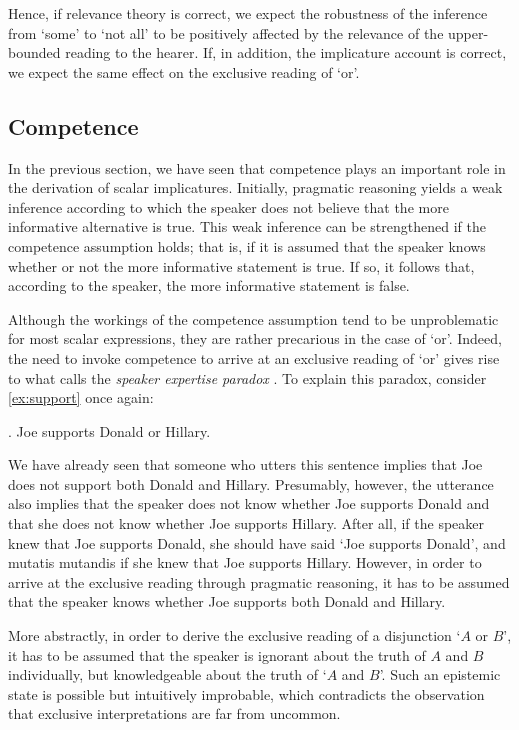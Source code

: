 \documentclass[12pt]{article}
\begin{document}
Hence, if relevance theory is correct, we expect the robustness of the inference from `some' to `not all' to be positively affected by the relevance of the upper-bounded reading to the hearer. If, in addition, the implicature account is correct, we expect the same effect on the exclusive reading of `or'.

\subsection*{Competence}

In the previous section, we have seen that competence plays an important role in the derivation of scalar implicatures. Initially, pragmatic reasoning yields a weak inference according to which the speaker does not believe that the more informative alternative is true. This weak inference can be strengthened if the competence assumption holds; that is, if it is assumed that the speaker knows whether or not the more informative statement is true. If so, it follows that, according to the speaker, the more informative statement is false.

Although the workings of the competence assumption tend to be unproblematic for most scalar expressions, they are rather precarious in the case of `or'. Indeed, the need to invoke competence to arrive at an exclusive reading of `or' gives rise to what \citet{zondervan2010} calls the \emph{speaker expertise paradox} \citep[cf.][]{geurts2006}. To explain this paradox, consider \ref{ex:support} once again:

\ex.	Joe supports Donald or Hillary.

We have already seen that someone who utters this sentence implies that Joe does not support
both Donald and Hillary. Presumably, however, the utterance also implies that the speaker does not know whether
Joe supports Donald and that she does not know whether Joe supports Hillary. After all, if the speaker knew that Joe supports Donald, she should have said `Joe supports Donald', and mutatis mutandis if she knew that Joe supports Hillary. However, in order to arrive at the exclusive reading through pragmatic reasoning, it has to be assumed that the
speaker knows whether Joe supports both Donald and Hillary. 

More abstractly, in order to derive
the exclusive reading of a disjunction `$A$ or $B$', it has to be assumed that the speaker is
ignorant about the truth of $A$ and $B$ individually, but knowledgeable about the truth of `$A$ and $B$'. Such an epistemic state is possible but intuitively improbable, which contradicts the observation that exclusive interpretations are far from uncommon.
\end{document}
